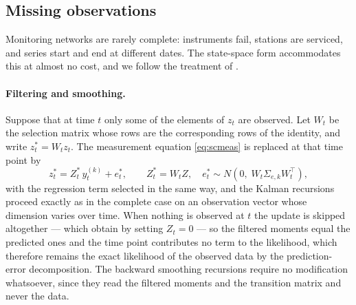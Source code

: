 \subsection{Missing observations}\label{sec:missing}

Monitoring networks are rarely complete: instruments fail, stations are serviced, and series start and end at different dates. The state-space form accommodates this at almost no cost, and we follow the treatment of \citet[Sections~2.7 and~4.10]{DurbinKoopman2012}.

\paragraph{Filtering and smoothing.} Suppose that at time $t$ only some of the elements of $z_t$ are observed. Let $W_t$ be the selection matrix whose rows are the corresponding rows of the identity, and write $z^*_t = W_t z_t$. The measurement equation \eqref{eq:scmeas} is replaced at that time point by
\begin{equation}\label{eq:selection}
  z^*_t = Z^*_t\, y^{(k)}_t + e^*_t, \qquad
  Z^*_t = W_t Z, \quad e^*_t \sim N\!\left(0,\; W_t \Sigma_{e,k} W_t^\top\right),
\end{equation}
with the regression term selected in the same way, and the Kalman recursions proceed exactly as in the complete case on an observation vector whose dimension varies over time. When nothing is observed at $t$ the update is skipped altogether --- which \citet{DurbinKoopman2012} obtain by setting $Z_t = 0$ --- so the filtered moments equal the predicted ones and the time point contributes no term to the likelihood, which therefore remains the exact likelihood of the observed data by the prediction-error decomposition. The backward smoothing recursions require no modification whatsoever, since they read the filtered moments and the transition matrix and never the data.

